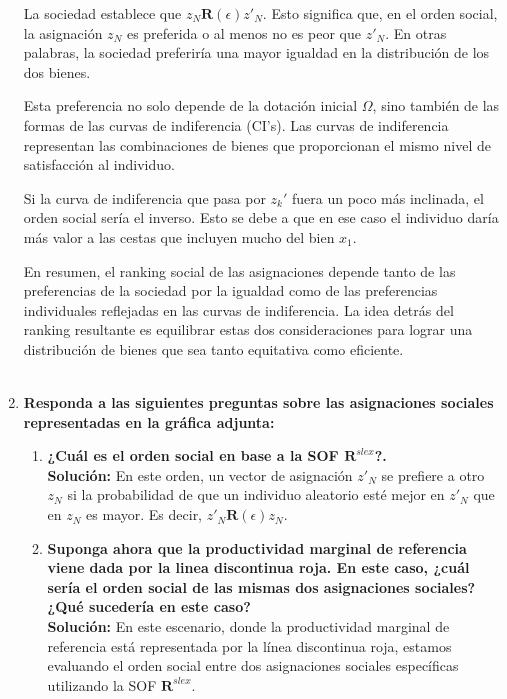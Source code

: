 \begin{enumerate}
La sociedad establece que $z_N \textbf{R}(\epsilon)z'_N$. Esto significa que, en el orden social, la asignación $z_N$ es preferida o al menos no es peor que $z'_N$. En otras palabras, la sociedad preferiría una mayor igualdad en la distribución de los dos bienes.

Esta preferencia no solo depende de la dotación inicial $\Omega$, sino también de las formas de las curvas de indiferencia (CI’s). Las curvas de indiferencia representan las combinaciones de bienes que proporcionan el mismo nivel de satisfacción al individuo.

Si la curva de indiferencia que pasa por $z_k'$ fuera un poco más inclinada, el orden social sería el inverso. Esto se debe a que en ese caso el individuo daría más valor a las cestas que incluyen mucho del bien $x_1$.

En resumen, el ranking social de las asignaciones depende tanto de las preferencias de la sociedad por la igualdad como de las preferencias individuales reflejadas en las curvas de indiferencia. La idea detrás del ranking resultante es equilibrar estas dos consideraciones para lograr una distribución de bienes que sea tanto equitativa como eficiente.\\\\


    \item \textbf{Responda a las siguientes preguntas sobre las asignaciones sociales representadas en la gráfica adjunta:}
	\begin{enumerate}[\bfseries i)]

	    \item  \textbf{\boldmath ¿Cuál es el orden social en base a la SOF $\textbf{R}^{slex}$?.}\\

		\textbf{Solución:} En este orden, un vector de asignación $z'_N$ se prefiere a otro $z_N$ si la probabilidad de que un individuo aleatorio esté mejor en $z'_N$ que en $z_N$ es mayor. Es decir, $z'_N\textbf{R}(\epsilon)z_N$.\\

	    \item \textbf{Suponga ahora que la productividad marginal de referencia viene dada por la linea discontinua roja. En este caso, ¿cuál sería el orden social de las mismas dos asignaciones sociales? ¿Qué sucedería en este caso?}\\

		\textbf{Solución:} En este escenario, donde la productividad marginal de referencia está representada por la línea discontinua roja, estamos evaluando el orden social entre dos asignaciones sociales específicas utilizando la SOF $\textbf{R}^{slex}$.


\end{enumerate}
\end{enumerate}
